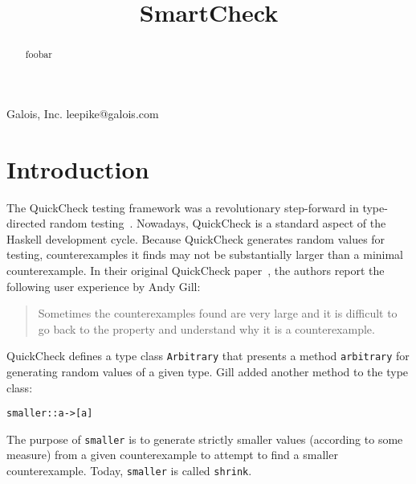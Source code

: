 \documentclass[10pt]{sigplanconf}
\newenvironment{code}{\begin{alltt}}{\end{alltt}}
\newcommand{\ttp}[1]{\texttt{#1}}
\begin{document}


\title{SmartCheck}

           {Galois, Inc.}
           {leepike@galois.com}
\maketitle

\begin{abstract}
foobar
\end{abstract}





\section{Introduction}\label{sec:intro}

The QuickCheck testing framework was a revolutionary step-forward in
type-directed random testing~\cite{qc}.  Nowadays, QuickCheck is a standard
aspect of the Haskell development cycle.  Because QuickCheck generates random
values for testing, counterexamples it finds may not be substantially larger
than a minimal counterexample.  In their original QuickCheck paper~\cite{qc},
the authors report the following user experience by Andy Gill:
%
\begin{quote}
Sometimes the counterexamples found are very large and it is difficult to go
back to the property and understand why it is a counterexample.
\end{quote}
%
\noindent
QuickCheck defines a type class \ttp{Arbitrary} that presents a method
\ttp{arbitrary} for generating random values of a given type.  Gill added another
method to the type class:
%
\begin{code}
smaller :: a -> [a] 
\end{code}
%
\noindent
The purpose of \ttp{smaller} is to generate strictly smaller values (according to
some measure) from a given counterexample to attempt to find a smaller
counterexample.  Today, \ttp{smaller} is called \ttp{shrink}.
\end{document}
